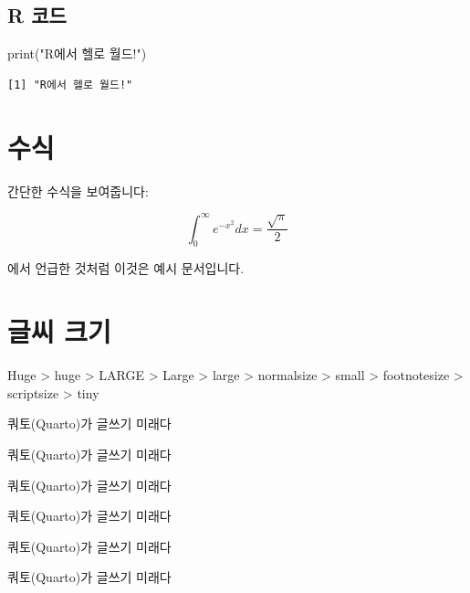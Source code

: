 \documentclass[
  letterpaper,
  DIV=11,
  numbers=noendperiod]{scrartcl}
\newenvironment{Shaded}{\begin{snugshade}}{\end{snugshade}}
\newcommand{\FunctionTok}[1]{\textcolor[rgb]{0.28,0.35,0.67}{#1}}
\newcommand{\NormalTok}[1]{\textcolor[rgb]{0.00,0.23,0.31}{#1}}
\newcommand{\StringTok}[1]{\textcolor[rgb]{0.13,0.47,0.30}{#1}}
\begin{document}
\hypertarget{r-uxcf54uxb4dc}{%
\subsection{R 코드}\label{r-uxcf54uxb4dc}}

\begin{Shaded}
\begin{Highlighting}[]
\FunctionTok{print}\NormalTok{(}\StringTok{"R에서 헬로 월드!"}\NormalTok{)}
\end{Highlighting}
\end{Shaded}

\begin{verbatim}
[1] "R에서 헬로 월드!"
\end{verbatim}

\hypertarget{uxc218uxc2dd}{%
\section{수식}\label{uxc218uxc2dd}}

간단한 수식을 보여줍니다:

\[
\int_0^\infty e^{-x^2} dx = \frac{\sqrt{\pi}}{2}
\]

\autocite{Smith2021}에서 언급한 것처럼 이것은 예시 문서입니다.

\hypertarget{uxae00uxc528-uxd06cuxae30}{%
\section{글씨 크기}\label{uxae00uxc528-uxd06cuxae30}}

Huge \textgreater{} huge \textgreater{} LARGE \textgreater{} Large
\textgreater{} large \textgreater{} normalsize \textgreater{} small
\textgreater{} footnotesize \textgreater{} scriptsize \textgreater{}
tiny

\Huge

쿼토(Quarto)가 글쓰기 미래다

\huge

쿼토(Quarto)가 글쓰기 미래다

\LARGE

쿼토(Quarto)가 글쓰기 미래다

\normalsize

쿼토(Quarto)가 글쓰기 미래다

\small

쿼토(Quarto)가 글쓰기 미래다

\footnotesize

쿼토(Quarto)가 글쓰기 미래다

\tiny
\end{document}
